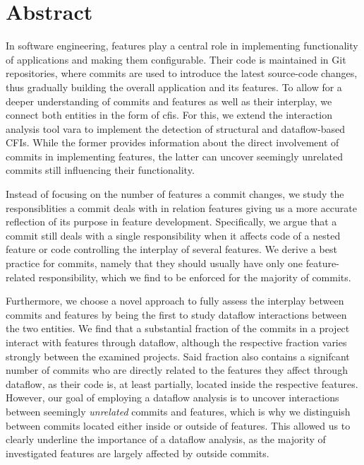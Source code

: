 \begingroup
\let\clearpage\relax
\let\cleardoublepage\relax
\let\cleardoublepage\relax

\chapter*{Abstract}

In software engineering, features play a central role in implementing functionality of applications and making them configurable. 
Their code is maintained in Git repositories, where commits are used to introduce the latest source-code changes, thus gradually building the overall application and its features. 
To allow for a deeper understanding of commits and features as well as their interplay, we connect both entities in the form of \acp{cfi}.
For this, we extend the interaction analysis tool \acs{vara} to implement the detection of structural and dataflow-based CFIs.
While the former provides information about the direct involvement of commits in implementing features, the latter can uncover seemingly unrelated commits still influencing their functionality.

Instead of focusing on the number of features a commit changes, we study the responsiblities a commit deals with in relation features giving us a more accurate reflection of its purpose in feature development.
Specifically, we argue that a commit still deals with a single responsibility when it affects code of a nested feature or code controlling the interplay of several features.
We derive a best practice for commits, namely that they should usually have only one feature-related responsibility, which we find to be enforced for the majority of commits. %

Furthermore, we choose a novel approach to fully assess the interplay between commits and features by being the first to study dataflow interactions between the two entities. 
We find that a substantial fraction of the commits in a project interact with features through dataflow, although the respective fraction varies strongly between the examined projects. %
Said fraction also contains a signifcant number of commits who are directly related to the features they affect through dataflow, as their code is, at least partially, located inside the respective features. %
However, our goal of employing a dataflow analysis is to uncover interactions between seemingly \emph{unrelated} commits and features, which is why we distinguish between commits located either inside or outside of features.
This allowed us to clearly underline the importance of a dataflow analysis, as the majority of investigated features are largely affected by outside commits. %

